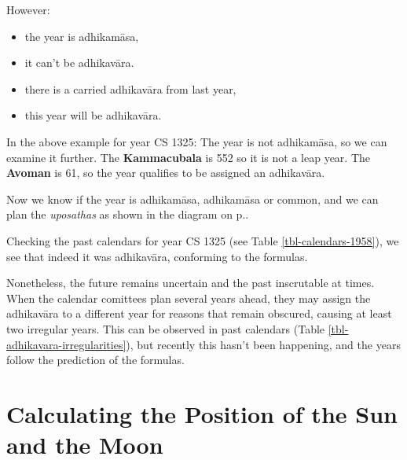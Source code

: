 \documentclass[11pt,oneside]{memoir-article}
\begin{document}

However:

\begin{itemize}
\item {} the year is adhikamāsa,
\item {} it can't be adhikavāra.
\item {} there is a carried adhikavāra from last year,
\item {} this year will be adhikavāra.
\end{itemize}

In the above example for year CS 1325: The year is not adhikamāsa, so we can
examine it further. The \textbf{Kammacubala} is 552 so it is not a leap year. The
\textbf{Avoman} is 61, so the year qualifies to be assigned an adhikavāra.

Now we know if the year is adhikamāsa, adhikamāsa or common, and we can plan the
\emph{uposathas} as shown in the diagram on
p.\pageref{dia-common-adhikamasa-adhikavara}.

Checking the past calendars for year CS 1325 (see Table
\ref{tbl-calendars-1958}), we see that indeed it was adhikavāra, conforming to
the formulas.

Nonetheless, the future remains uncertain and the past inscrutable at times.
When the calendar comittees plan several years ahead, they may assign the
adhikavāra to a different year for reasons that remain obscured, causing at
least two irregular years. This can be observed in past calendars (Table
\ref{tbl-adhikavara-irregularities}), but recently this hasn't been happening,
and the years follow the prediction of the formulas.

\section{Calculating the Position of the Sun and the Moon}
\label{sec-5-5}
\end{document}

